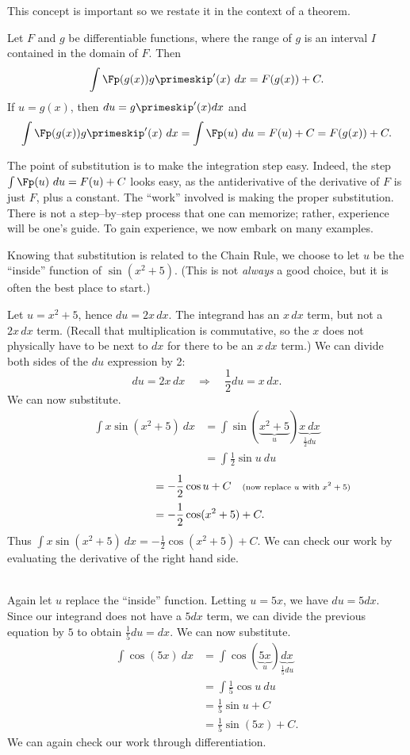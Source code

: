 This concept is important so we restate it in the context of a theorem.

{Let $F$ and $g$ be differentiable functions, where the range of $g$ is an interval $I$ contained in the domain of $F$. Then 
	$$\int \Fp(g(x))g\primeskip'(x)\ dx = F(g(x)) + C.$$
If $u = g(x)$, then $du = g\primeskip'(x)dx$ and 
	$$\int \Fp(g(x))g\primeskip'(x)\ dx = \int \Fp(u)\ du = F(u)+C = F(g(x))+C.$$
}

The point of substitution is to make the integration step easy. Indeed, the step $\int \Fp(u)\ du = F(u) + C$ looks easy, as the antiderivative of the derivative of $F$ is just $F$, plus a constant. The ``work'' involved is making the proper substitution. There is not a step--by--step process that one can memorize; rather, experience will be one's guide. To gain experience, we now embark on many examples.\\

{Knowing that substitution is related to the Chain Rule, we choose to let $u$ be the ``inside'' function of $\sin(x^2+5)$. (This is not \emph{always} a good choice, but it is often the best place to start.)

Let $u = x^2+5$, hence $du = 2x\,dx$. The integrand has an $x\,dx$ term, but not a $2x\,dx$ term. (Recall that multiplication is commutative, so the $x$ does not physically have to be next to $dx$ for there to be an $x\,dx$ term.) We can divide both sides of the $du$ expression by 2:
	$$du = 2x\,dx \quad \Rightarrow \quad \frac12du = x\,dx.$$ We can now substitute.
	\begin{align*}\int x\sin(x^2+5)\ dx &= \int \sin(\underbrace{x^2+5}_u) \underbrace{x\ dx}_{\frac12du}\\
						 &= \int \frac12\sin u\ du
\end{align*}
\begin{align*}
			\phantom{\int x\sin(x^2+5)\ dx} &= -\frac12\cos u + C \quad \text{\scriptsize (now replace $u$ with $x^2+5$)}\\
						 &=-\frac12\cos(x^2+5) + C.
	\end{align*}
Thus $\int x\sin(x^2+5)\ dx = -\frac12\cos(x^2+5)+C$. We can check our work by evaluating the derivative of the right hand side.
}\\

{Again let $u$ replace the ``inside'' function. Letting $u = 5x$, we have $du = 5dx$. Since our integrand does not have a $5dx$ term, we can divide the previous equation by $5$ to obtain $\frac15du = dx$. We can now substitute.
\begin{align*}
	\int \cos(5x)\ dx &= \int \cos(\underbrace{5x}_u) \underbrace{dx}_{\frac15du} \\
									&=	\int \frac15\cos u \ du \\
									&= \frac15\sin u + C \\
									&= \frac15\sin (5x)+C.
\end{align*}
We can again check our work through differentiation.
}\\

